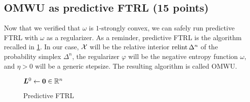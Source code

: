 \documentclass{homework}
\newcommand{\negent}{\omega}
\begin{document}
\subsection{OMWU as predictive FTRL (15 points)}\label{sec:omwu as ftrl}

Now that we verified that $\negent$ is $1$-strongly convex, we can safely run predictive FTRL with $\negent$ as a regularizer. As a reminder, predictive FTRL is the algorithm recalled in \cref{algo:predictive ftrl}. In our case, $\mathcal{X}$ will be the relative interior $\operatorname{relint}\Delta^n$ of the probability simplex $\Delta^n$, the regularizer $\varphi$ will be the negative entropy function $\negent$, and $\eta > 0$ will be a generic stepsize. The resulting algorithm is called OMWU.

\begin{figure}[th]\centering
    \begin{minipage}[t]{.485\linewidth}
        \SetInd{0.25em}{0.4em}
        \begin{algorithm}[H]\caption{Predictive FTRL}\label{algo:predictive ftrl}
            \DontPrintSemicolon
            \BlankLine
            $\bm{L}^0 \gets \bm{0} \in \mathbb{R}^n$\;
            \Hline{}
            \Fn{\normalfont\textsc{NextStrategy}($\vec{m}^{t}$)}{
                \Comment{\color{commentcolor} Set $\vec{m}^t = \vec{0}$ for non-predictive version]}\vspace{1mm}
                \Return{$\displaystyle\argmax_{\xhat \in \cX} \mleft\{(\vec{L}^{t-1} + \vec{m}^t)^\top \xhat - \frac{1}{\eta}\varphi(\xhat)\mright\}$}\hspace*{-4cm}\;\label{line:ftrl next strategy}\vspace{1mm}
            }
            \Hline{}
        \end{algorithm}
    \end{minipage}
    \hfill
    \begin{minipage}[t]{.485\linewidth}

\end{minipage}
\end{figure}
\end{document}
